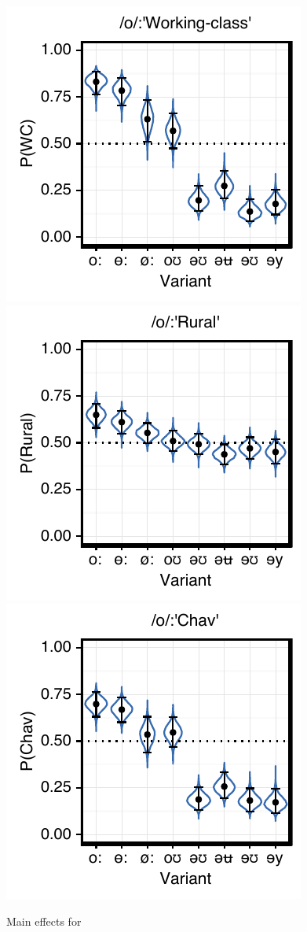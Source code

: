 \documentclass[PWPL]{article}
\begin{document}
\subsubsection{}
\begin{figure}[ht]
\centering
\caption{Main effects for }
\includegraphics[scale=0.65]{ow_class.pdf}
\includegraphics[scale=0.65]{ow_local.pdf}
\includegraphics[scale=0.65]{ow_chav.pdf}
\end{figure}
\end{document}
